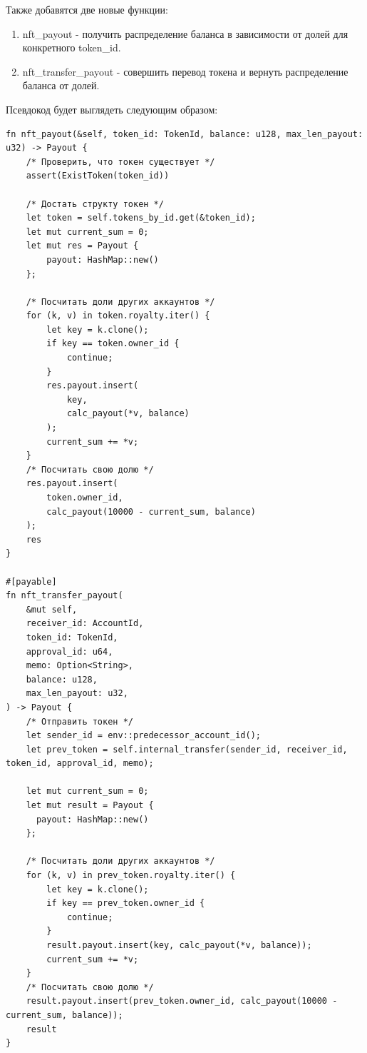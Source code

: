 Также добавятся две новые функции:
\begin{enumerate}
\item nft\_payout - получить распределение баланса в зависимости от долей для конкретного token\_id.
\item nft\_transfer\_payout - совершить перевод токена и вернуть распределение баланса от долей.
\end{enumerate}
Псевдокод будет выглядеть следующим образом:
\begin{verbatim}
fn nft_payout(&self, token_id: TokenId, balance: u128, max_len_payout: u32) -> Payout {
    /* Проверить, что токен существует */
    assert(ExistToken(token_id))

    /* Достать структу токен */
    let token = self.tokens_by_id.get(&token_id);
    let mut current_sum = 0;
    let mut res = Payout {
        payout: HashMap::new()
    };

    /* Посчитать доли других аккаунтов */
    for (k, v) in token.royalty.iter() {
        let key = k.clone();
        if key == token.owner_id {
            continue;
        }
        res.payout.insert(
            key,
            calc_payout(*v, balance)
        );
        current_sum += *v;
    }
    /* Посчитать свою долю */
    res.payout.insert(
        token.owner_id,
        calc_payout(10000 - current_sum, balance)
    );
    res
}

#[payable]
fn nft_transfer_payout(
    &mut self,
    receiver_id: AccountId,
    token_id: TokenId,
    approval_id: u64,
    memo: Option<String>,
    balance: u128,
    max_len_payout: u32,
) -> Payout {
    /* Отправить токен */
    let sender_id = env::predecessor_account_id();
    let prev_token = self.internal_transfer(sender_id, receiver_id, token_id, approval_id, memo);

    let mut current_sum = 0;
    let mut result = Payout {
      payout: HashMap::new()
    };

    /* Посчитать доли других аккаунтов */
    for (k, v) in prev_token.royalty.iter() {
        let key = k.clone();
        if key == prev_token.owner_id {
            continue;
        }
        result.payout.insert(key, calc_payout(*v, balance));
        current_sum += *v;
    }
    /* Посчитать свою долю */
    result.payout.insert(prev_token.owner_id, calc_payout(10000 - current_sum, balance));
    result
}
\end{verbatim}


